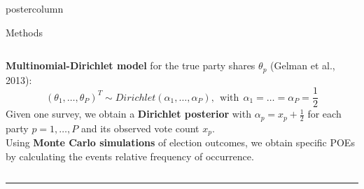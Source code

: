 \documentclass[final,hyperref={pdfpagelabels=false}]{beamer}
\newcommand{\darkgray}[1]{\textcolor{koaladarkgray}{#1}}
\begin{document}
\begin{frame}
\begin{columns}
\begin{column}{1\textwidth}
\begin{columns}[T]
\begin{column}{.484\textwidth}
\begin{beamercolorbox}[center,wd=\textwidth]{postercolumn}
\begin{minipage}[T]{.95\textwidth}
\begin{block}{\footnotesize Methods}
\begin{minipage}{\textwidth}
\begin{columns}[t]
  \begin{column}{.93\textwidth}
  \vspace{7px}
  \begin{minipage}{\textwidth}
  \darkgray{\textbf{Multinomial-Dirichlet model}}
for the true party shares $\theta_p$ {\footnotesize (Gelman et al., 2013)}:
$$
(\theta_1,\ldots,\theta_P)^T \sim Dirichlet(\alpha_1,\ldots,\alpha_P), \ \ \text{with} \ \ \alpha_1 = \ldots = \alpha_P = \frac{1}{2}
$$
Given one survey, we obtain a \darkgray{\textbf{Dirichlet posterior}}
with $\alpha_p = x_p + \frac{1}{2}$ for each party $p=1,\ldots,P$ and its observed
vote count $x_p$.
\\[0.5cm]
Using \darkgray{\textbf{Monte Carlo simulations}} of election outcomes, we obtain 
specific POEs by calculating the events relative frequency of occurrence.
  \end{minipage}
  \vspace{7px}
  \end{column}
\end{columns}
\end{minipage}

\vspace{1ex}
\textcolor{LMUlightgray}{\hrule{}}
\vspace{40px}


\end{block}
\end{minipage}
\end{beamercolorbox}
\end{column}
\end{columns}
\end{column}
\end{columns}
\end{frame}
\end{document}
